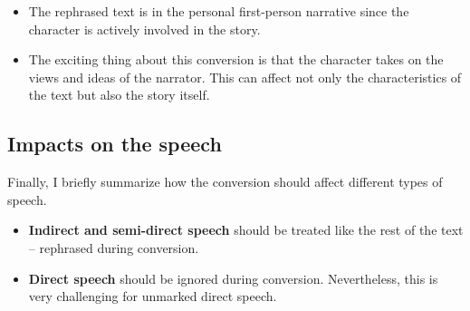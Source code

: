 \begin{itemize}
	\item The rephrased text is in the personal first-person narrative since the character is actively involved in the story.
	\item The exciting thing about this conversion is that the character takes on the views and ideas of the narrator. This can affect not only the characteristics of the text but also the story itself.
\end{itemize}


\subsection*{Impacts on the speech}

Finally, I briefly summarize how the conversion should affect different types of speech.

\begin{itemize}
	\item \textbf{Indirect and semi-direct speech} should be treated like the rest of the text -- rephrased during conversion.
	\item \textbf{Direct speech} should be ignored during conversion. Nevertheless, this is very challenging for unmarked direct speech.
\end{itemize}

